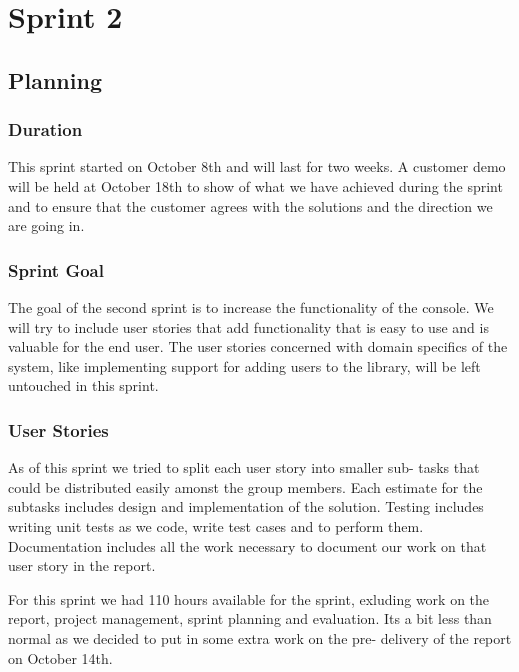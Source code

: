 \chapter{Sprint 2}
\section{Planning}

\subsection{Duration}
This sprint started on October 8th and will last for two weeks. A customer demo will be held at October 18th to show of what we have achieved during the sprint and to ensure that the customer agrees with the solutions and the direction we are going in.

\subsection{Sprint Goal}
The goal of the second sprint is to increase the functionality of the console. We will try to include user stories that add functionality that is easy to use and is valuable for the end user. The user stories concerned with domain specifics of the system, like implementing support for adding users to the library, will be left untouched in this sprint.

\subsection{User Stories}
As of this sprint we tried to split each user story into smaller sub- tasks that could be distributed easily amonst the group members. Each estimate for the subtasks includes design and implementation of the solution. Testing includes writing unit tests as we code, write test cases and to perform them. Documentation includes all the work necessary to document our work on that user story in the report.

For this sprint we had 110 hours available for the sprint, exluding work on the report, project management, sprint planning and evaluation. Its a bit less than normal as we decided to put in some extra work on the pre- delivery of the report on October 14th.

